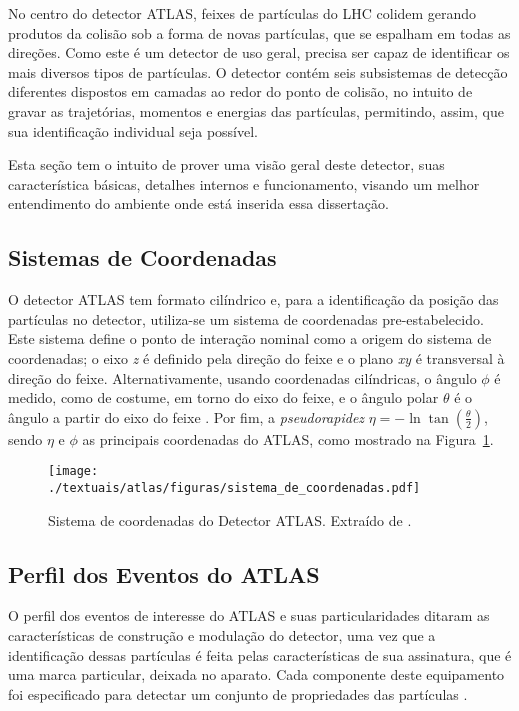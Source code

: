 No centro do detector ATLAS, feixes de partículas do LHC colidem gerando produtos da colisão sob a forma de novas partículas, que se espalham em todas as direções. Como este é um detector de uso geral, precisa ser capaz de identificar os mais diversos tipos de partículas. O detector contém seis subsistemas de detecção diferentes dispostos em camadas ao redor do ponto de colisão, no intuito de gravar as trajetórias, momentos e energias das partículas, permitindo, assim, que sua identificação individual seja possível.

Esta seção tem o intuito de prover uma visão geral deste detector, suas característica básicas, detalhes internos e funcionamento, visando um melhor entendimento do ambiente onde está inserida essa dissertação.

\subsection{Sistemas de Coordenadas}\label{subsec:sist_coord}

O detector \ac{ATLAS} tem  formato cilíndrico e, para a identificação da posição das partículas no detector, utiliza-se um sistema de coordenadas pre-estabelecido. Este sistema define o ponto de interação nominal como a origem do sistema de coordenadas; o eixo \emph{z} é definido pela direção do feixe e o plano \emph{xy} é transversal à direção do feixe. Alternativamente, usando coordenadas cilíndricas, o ângulo $\phi$ é medido, como de costume, em torno do eixo do feixe, e o ângulo polar $\theta$ é o ângulo a partir do eixo do feixe \cite{aad2008atlas}. Por fim, a \emph{pseudorapidez} $\eta  =  - \ln \tan \left( {\frac{\theta }{2}} \right)$, sendo $\eta$ e $\phi$ as principais coordenadas do ATLAS, como mostrado na Figura~\ref{fig:2T07}.

\begin{figure}[!h]
	\centering
	\texttt{[image: ./textuais/atlas/figuras/sistema\_de\_coordenadas.pdf]}\\
	\caption{Sistema de coordenadas do Detector ATLAS. Extraído de \cite{dos2006sistema}.}
	\label{fig:2T07}
\end{figure}

\subsection{Perfil dos Eventos do ATLAS}\label{subsec:perfil_eve}

O perfil dos eventos de interesse do ATLAS e suas particularidades ditaram as características de construção e modulação do detector, uma vez que a identificação dessas partículas é feita pelas características de sua assinatura, que é uma marca particular, deixada no aparato. Cada componente deste equipamento foi especificado para detectar um conjunto de propriedades das partículas \cite{Lippmann:2011bb}.

